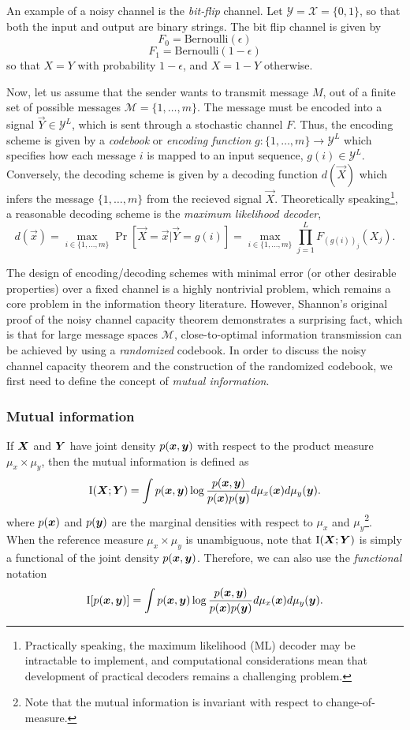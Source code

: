 An example of a noisy channel is the \emph{bit-flip} channel.
Let $\mathcal{Y} = \mathcal{X} = \{0,1\}$, so that both the input and output are binary strings.
The bit flip channel is given by
\[
F_0 = \text{Bernoulli}(\epsilon)
\]
\[
F_1 = \text{Bernoulli}(1-\epsilon)
\]
so that $X = Y$ with probability $1-\epsilon$, and $X = 1-Y$
otherwise.

Now, let us assume that the sender wants to transmit message $M$, out
of a finite set of possible messages $\mathcal{M} = \{1,\hdots, m\}$.
The message must be encoded into a signal $\vec{Y} \in \mathcal{Y}^L$,
which is sent through a stochastic channel $F$.  Thus, the encoding
scheme is given by a \emph{codebook} or \emph{encoding function} $g:
\{1,\hdots, m\} \to \mathcal{Y}^L$ which specifies how each message
$i$ is mapped to an input sequence, $g(i) \in \mathcal{Y}^L$.
Conversely, the decoding scheme is given by a decoding function
$d(\vec{X})$ which infers the message $\{1,\hdots, m\}$ from the
recieved signal $\vec{X}$.  Theoretically
speaking\footnote{Practically speaking, the maximum likelihood (ML)
  decoder may be intractable to implement, and computational
  considerations mean that development of practical decoders remains a
  challenging problem.}, a reasonable decoding scheme is the
\emph{maximum likelihood decoder},
\[
d(\vec{x}) = \max_{i \in \{1,\hdots, m\}} \Pr[\vec{X} = \vec{x}| \vec{Y} = g(i)] = \max_{i \in \{1,\hdots, m\}} \prod_{j=1}^L F_{(g(i))_j}(X_j).
\]

The design of encoding/decoding schemes with minimal error (or other
desirable properties) over a fixed channel is a highly nontrivial
problem, which remains a core problem in the information theory
literature.  However, Shannon's original proof of the noisy channel
capacity theorem demonstrates a surprising fact, which is that for
large message spaces $\mathcal{M}$, close-to-optimal information
transmission can be achieved by using a \emph{randomized} codebook.
In order to discuss the noisy channel capacity theorem and the
construction of the randomized codebook, we first need to define
the concept of \emph{mutual information}.

\subsubsection{Mutual information}

If $\boldsymbol{X}$ and $\boldsymbol{Y}$ have joint density $p(\boldsymbol{x}, \boldsymbol{y})$ with respect to
the product measure $\mu_x \times \mu_y$, then the mutual information
is defined as
\[
\text{I}(\boldsymbol{X};\boldsymbol{Y}) = \int p(\boldsymbol{x}, \boldsymbol{y}) \log \frac{p(\boldsymbol{x}, \boldsymbol{y})}{p(\boldsymbol{x})p(\boldsymbol{y})}d\mu_x(\boldsymbol{x}) d\mu_y(\boldsymbol{y}).
\]
where $p(\boldsymbol{x})$ and $p(\boldsymbol{y})$ are the marginal densities with respect to
$\mu_x$ and $\mu_y$\footnote{Note that the mutual information is
  invariant with respect to change-of-measure.}.  When the reference
measure $\mu_x \times \mu_y$ is unambiguous, note that $\text{I}(\boldsymbol{X};\boldsymbol{Y})$ is
simply a functional of the joint density $p(\boldsymbol{x}, \boldsymbol{y})$.  Therefore, we
can also use the \emph{functional} notation
\[
\text{I}[p(\boldsymbol{x}, \boldsymbol{y})] = \int p(\boldsymbol{x}, \boldsymbol{y}) \log \frac{p(\boldsymbol{x}, \boldsymbol{y})}{p(\boldsymbol{x})p(\boldsymbol{y})}d\mu_x(\boldsymbol{x}) d\mu_y(\boldsymbol{y}).
\]


